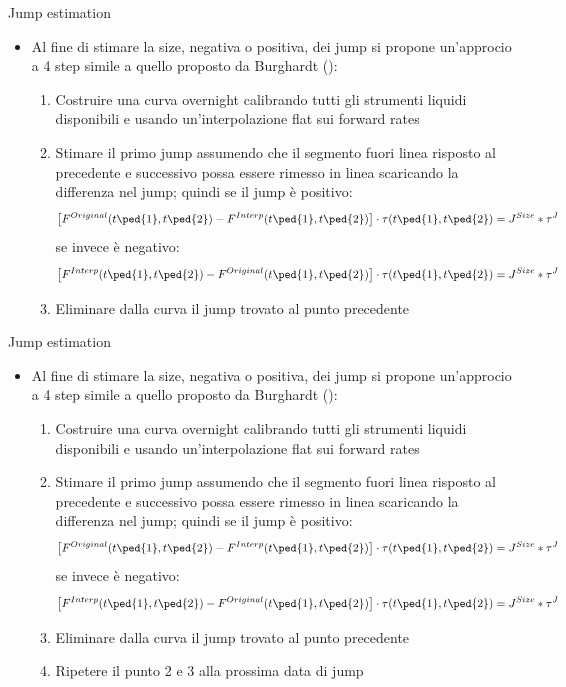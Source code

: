 \begin{tframe}{Jump estimation}
\begin{itemize}
\item Al fine di stimare la size, negativa o positiva, dei jump si propone un'approcio a 4 step simile a quello proposto da Burghardt (\cite{burgh}):
   \begin{enumerate}
   \item Costruire una curva overnight calibrando tutti gli strumenti liquidi disponibili e usando un'interpolazione flat sui forward rates
   \item Stimare il primo jump assumendo che il segmento fuori linea risposto al precedente e successivo possa essere rimesso in linea scaricando la differenza nel jump; quindi se il jump è positivo:
   $$\left[F^{Original}(t\ped{1},t\ped{2}) - F^{Interp}(t\ped{1},t\ped{2})\right] \cdot \tau(t\ped{1},t\ped{2}) = J^{Size}*\tau^{J}$$
   se invece è negativo:
   $$\left[F^{Interp}(t\ped{1},t\ped{2}) - F^{Original}(t\ped{1},t\ped{2})\right] \cdot \tau(t\ped{1},t\ped{2}) = J^{Size}*\tau^{J}$$
   \item Eliminare dalla curva il jump trovato al punto precedente
   \end{enumerate}
\end{itemize}
\end{tframe}
\begin{tframe}{Jump estimation}
\begin{itemize}
\item Al fine di stimare la size, negativa o positiva, dei jump si propone un'approcio a 4 step simile a quello proposto da Burghardt (\cite{burgh}):
   \begin{enumerate}
   \item Costruire una curva overnight calibrando tutti gli strumenti liquidi disponibili e usando un'interpolazione flat sui forward rates
   \item Stimare il primo jump assumendo che il segmento fuori linea risposto al precedente e successivo possa essere rimesso in linea scaricando la differenza nel jump; quindi se il jump è positivo:
   $$\left[F^{Original}(t\ped{1},t\ped{2}) - F^{Interp}(t\ped{1},t\ped{2})\right] \cdot \tau(t\ped{1},t\ped{2}) = J^{Size}*\tau^{J}$$
   se invece è negativo:
   $$\left[F^{Interp}(t\ped{1},t\ped{2}) - F^{Original}(t\ped{1},t\ped{2})\right] \cdot \tau(t\ped{1},t\ped{2}) = J^{Size}*\tau^{J}$$
   \item Eliminare dalla curva il jump trovato al punto precedente
   \item Ripetere il punto 2 e 3 alla prossima data di jump
   \end{enumerate}
\end{itemize}
\end{tframe}
